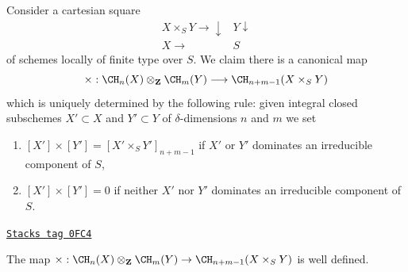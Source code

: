 \medskip\noindent
Consider a cartesian square
$$
\begin{array}{cc}X \times_S Y \longrightarrow\downarrow & Y \downarrow \\ X \longrightarrow & S\end{array}
$$
of schemes locally of finite type over $S$. We claim there is a canonical map
$$
\times :
\CH_n(X) \otimes_{\mathbf{Z}} \CH_m(Y)
\longrightarrow
\CH_{n + m - 1}(X \times_S Y)
$$
which is uniquely determined by the following rule:
given integral closed subschemes $X' \subset X$
and $Y' \subset Y$ of $\delta$-dimensions $n$ and $m$ we set
\begin{enumerate}
\item $[X'] \times [Y'] = [X' \times_S Y']_{n + m - 1}$ if
$X'$ or $Y'$ dominates an irreducible component of $S$,
\item $[X'] \times [Y'] = 0$ if neither $X'$ nor $Y'$ dominates an
irreducible component of $S$.
\end{enumerate}

\begin{lemma}
\label{chow-lemma-exterior-product-well-defined-dim-1}
\href{https://stacks.math.columbia.edu/tag/0FC4}{\texttt{Stacks tag 0FC4}}

The map $\times : \CH_n(X) \otimes_{\mathbf{Z}} \CH_m(Y) \to
\CH_{n + m - 1}(X \times_S Y)$ is well defined.
\end{lemma}

